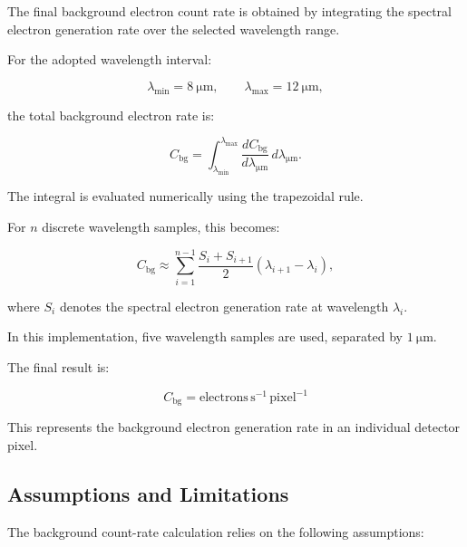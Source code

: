 \documentclass{article}
\begin{document}
The final background electron count rate is obtained by integrating the spectral electron generation rate over the selected wavelength range.

For the adopted wavelength interval:

\begin{equation}
\lambda_{\min}=8\ \mathrm{\mu m},
\qquad
\lambda_{\max}=12\ \mathrm{\mu m},
\end{equation}

the total background electron rate is:

\begin{equation}
C_{\mathrm{bg}}
=
\int_{\lambda_{\min}}^{\lambda_{\max}}
\frac{dC_{\mathrm{bg}}}
{d\lambda_{\mathrm{\mu m}}}
\,d\lambda_{\mathrm{\mu m}}.
\end{equation}

The integral is evaluated numerically using the trapezoidal rule.

For $n$ discrete wavelength samples, this becomes:

\begin{equation}
C_{\mathrm{bg}}
\approx
\sum_{i=1}^{n-1}
\frac{S_i+S_{i+1}}{2}
(\lambda_{i+1}-\lambda_i),
\end{equation}

where $S_i$ denotes the spectral electron generation rate at wavelength $\lambda_i$.

In this implementation, five wavelength samples are used, separated by $1\ \mathrm{\mu m}$.

The final result is:

\begin{equation}
\boxed{
C_{\mathrm{bg}}
=
\mathrm{electrons\,s^{-1}\,pixel^{-1}}
}
\end{equation}

This represents the background electron generation rate in an individual detector pixel.

\subsection{Assumptions and Limitations}

The background count-rate calculation relies on the following assumptions:
\end{document}
